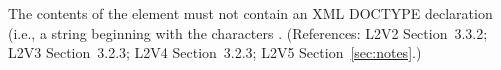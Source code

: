 The contents of the  element must not contain an XML
DOCTYPE declaration (i.e., a string beginning with the characters
.  (References: L2V2 Section~3.3.2;
L2V3 Section~3.2.3; L2V4 Section~3.2.3; L2V5 Section~\ref{sec:notes}.)

